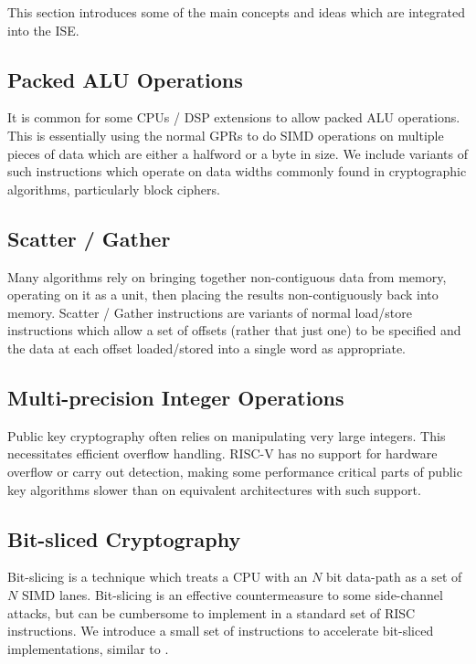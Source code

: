 
This section introduces some of the main concepts and ideas which are
integrated into the ISE.

\subsection{Packed ALU Operations}

It is common for some CPUs / DSP extensions to allow packed ALU operations.
This is essentially using the normal GPRs to do SIMD operations on multiple
pieces of data which are either a halfword or a byte in size. We include
variants of such instructions which operate on data widths commonly
found in cryptographic algorithms, particularly block ciphers.

\subsection{Scatter / Gather}

Many algorithms rely on bringing together non-contiguous data from memory,
operating on it as a unit, then placing the results non-contiguously back
into memory. Scatter / Gather instructions are variants of normal load/store
instructions which allow a set of offsets (rather that just one) to be
specified and the data at each offset loaded/stored into a single word
as appropriate.

\subsection{Multi-precision Integer Operations}

Public key cryptography often relies on manipulating very large integers.
This necessitates efficient overflow handling. RISC-V has no support for
hardware overflow or carry out detection, making some performance critical
parts of public key algorithms slower than on equivalent architectures
with such support.

\subsection{Bit-sliced Cryptography}

Bit-slicing is a technique which treats a CPU with an $N$ bit data-path as
a set of $N$ SIMD lanes. Bit-slicing is an effective countermeasure to some
side-channel attacks, but can be cumbersome to implement in a standard set of
RISC instructions. We introduce a small set of instructions to accelerate
bit-sliced implementations, similar to \cite{grabher2008light}.
